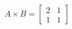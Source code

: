 \documentclass[preview]{standalone}
\begin{document}
\begin{align*}
A \times B = \begin{bmatrix} 2 & 1 \\ 1 & 1 \end{bmatrix}
\end{align*}
\end{document}

